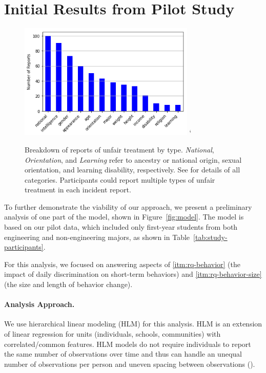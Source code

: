 \section{Initial Results from Pilot Study}
\label{sec:result}

\begin{figure}
\vspace{-1.5em}
    \centering
    \includegraphics[width=3.3in]{img/discrimination_breakdown.png}
`    \caption[Unfair treatment type breakdown]{Breakdown of \numdiscriminationeventsfinal reports of unfair treatment by type. \textit{National}, \textit{Orientation}, and \textit{Learning} refer to ancestry or national origin, sexual orientation, and learning disability, respectively. See  for details of all categories. Participants could report multiple types of unfair treatment in each incident report.
}
    \label{fig:data-discrimination-breakdown}
\end{figure}

To further demonstrate the viability of our approach, we present a preliminary analysis of one part of the model, shown in Figure~\ref{fig:model}. The model is based on our pilot data, which included only first-year students from both engineering and non-engineering majors, as shown in Table~\ref{tab:study-participants}. 

\noindent For this analysis, we focused on answering aspects of \ref{itm:rq-behavior} (the impact of daily discrimination on short-term behaviors) and \ref{itm:rq-behavior-size} (the size and length of behavior change). 

\paragraph{Analysis Approach.}
We use hierarchical linear modeling (HLM) for this analysis. HLM is an extension of linear regression for units (\eg individuals, schools, communities) with correlated/common features. %
HLM models do not require individuals to report the same number of observations over time and thus can handle an unequal number of observations per person and uneven spacing between observations (\cite{maas2005sufficient}).

